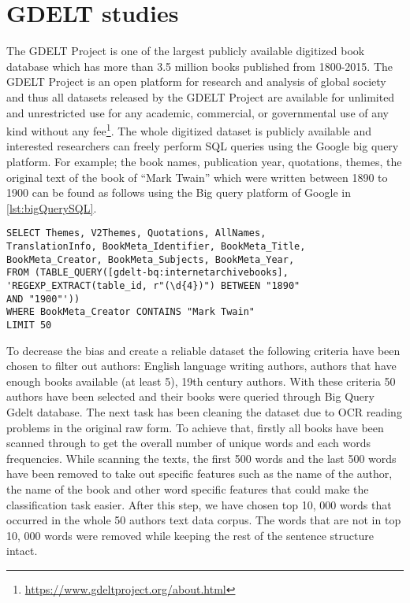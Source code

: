 \section{GDELT studies}
The GDELT Project is one of the largest publicly available digitized book database which has more than 3.5 million books published from 1800-2015. The GDELT Project is an open platform for research and analysis of global society and thus all datasets released by the GDELT Project are available for unlimited and unrestricted use for any academic, commercial, or governmental use of any kind without any fee\footnote{\url{https://www.gdeltproject.org/about.html}}. The whole digitized dataset is publicly available and interested researchers can freely perform SQL queries using the Google big query platform. For example; the book names, publication year, quotations, themes, the original text of the book of “Mark Twain” which were written between 1890 to 1900 can be found as follows
using the Big query platform of Google in \autoref{lst:bigQuerySQL}.
\begin{lstlisting}[linewidth=18cm, frame=none,caption={Google Big Query on GDELT},captionpos=b,label=lst:bigQuerySQL]
SELECT Themes, V2Themes, Quotations, AllNames, 
TranslationInfo, BookMeta_Identifier, BookMeta_Title, 
BookMeta_Creator, BookMeta_Subjects, BookMeta_Year,
FROM (TABLE_QUERY([gdelt-bq:internetarchivebooks],
'REGEXP_EXTRACT(table_id, r"(\d{4})") BETWEEN "1890" 
AND "1900"'))
WHERE BookMeta_Creator CONTAINS "Mark Twain"
LIMIT 50
\end{lstlisting}
To decrease the bias and create a reliable dataset the following criteria have been chosen to filter out authors: English language writing authors, authors that have enough books available (at least 5), 19th century authors. With these criteria 50 authors have been selected and their books were queried through Big Query Gdelt database. The next task has been cleaning the dataset due to OCR reading problems in the original raw form. To achieve that, firstly all books have been scanned through
to get the overall number of unique words and each words frequencies. While scanning the texts, the first 500 words and the last 500 words have been removed to take out specific features such as the name of the author, the name of the book and other word specific features that could make the classification task easier. After this step, we have chosen top 10, 000 words that occurred in the whole 50 authors text data corpus. The words that are not in top 10, 000 words were removed while keeping the rest of the sentence structure intact.
